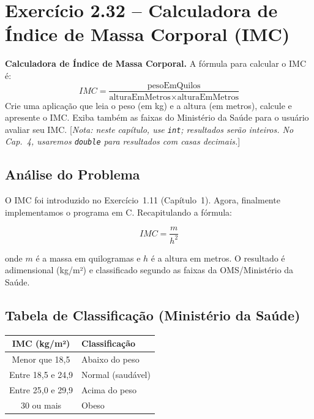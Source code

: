 \documentclass[12pt,a4paper]{article}
\begin{document}
\newpage

\section{Exercício 2.32 -- Calculadora de Índice de Massa Corporal (IMC)}

\begin{enunciadoBox}[Enunciado 2.32]
\textbf{Calculadora de Índice de Massa Corporal.}
A fórmula para calcular o IMC é:
\[
  IMC = \frac{\text{pesoEmQuilos}}{\text{alturaEmMetros} \times \text{alturaEmMetros}}
\]
Crie uma aplicação que leia o peso (em kg) e a altura (em metros), calcule e apresente
o IMC. Exiba também as faixas do Ministério da Saúde para o usuário avaliar seu IMC.
[\textit{Nota: neste capítulo, use \texttt{int}; resultados serão inteiros.
No Cap.~4, usaremos \texttt{double} para resultados com casas decimais.}]
\end{enunciadoBox}

\bigskip

\subsection{Análise do Problema}

O IMC foi introduzido no Exercício~1.11 (Capítulo~1). Agora, finalmente implementamos
o programa em C. Recapitulando a fórmula:

\[
  IMC = \frac{m}{h^2}
\]

onde $m$ é a massa em quilogramas e $h$ é a altura em metros. O resultado é adimensional
(kg/m²) e classificado segundo as faixas da OMS/Ministério da Saúde.

\subsection{Tabela de Classificação (Ministério da Saúde)}

\begin{center}
\renewcommand{\arraystretch}{1.5}
\begin{tabular}{c l}
  \toprule \textbf{IMC (kg/m²)} & \textbf{Classificação} \\ \midrule
  Menor que 18,5 & Abaixo do peso \\
  Entre 18,5 e 24,9 & Normal (saudável) \\
  Entre 25,0 e 29,9 & Acima do peso \\
  30 ou mais & Obeso \\ \bottomrule
\end{tabular}
\end{center}
\end{document}
